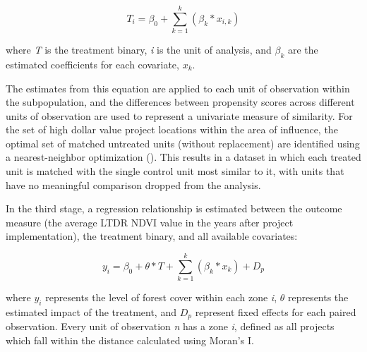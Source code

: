 \documentclass{article}\usepackage[]{graphicx}\usepackage[]{color}
\newenvironment{knitrout}{}{}  %
\begin{document}
\begin{knitrout}
\begin{equation}
T_{i} = \beta_{0} + \sum_{k=1}^{k}(\beta_{k}*x_{i,k})
\label{EQpropensity}
\end{equation}

where \textit{T} is the treatment binary, \textit{i} is the unit of analysis, and \begin{math}\beta_{k}\end{math} are the estimated coefficients for each covariate, \begin{math}x_{k}\end{math}.  

The estimates from this equation are applied to each unit of observation within the subpopulation, and the differences between propensity scores across different units of observation are used to represent a univariate measure of similarity.  
For the set of high dollar value project locations within the area of influence, the optimal set of matched untreated units (without replacement) are identified using a nearest-neighbor optimization (\cite{ho_matchit:_2011}). 
This results in a dataset in which each treated unit is matched with the single control unit most similar to it, with units that have no meaningful comparison dropped from the analysis.
\par

In the third stage, a regression relationship is estimated between the outcome measure (the average LTDR NDVI value in the years after project implementation), the treatment binary, and all available covariates:

\begin{equation}
y_i = \beta_{0} + \theta * T + \sum_{k=1}^{k}(\beta_{k}*x_{k}) + D_{p}
\label{EQgwr}
\end{equation}

where \begin{math}y_{i}\end{math} represents the level of forest cover within each zone \textit{i}, \begin{math}\theta\end{math} represents the estimated impact of the treatment, and \begin{math}D_{p}\end{math} represent fixed effects for each paired observation.
Every unit of observation \textit{n} has a zone \textit{i}, defined as all projects which fall within the distance calculated using Moran's I.

\par


\end{knitrout}
\end{document}

